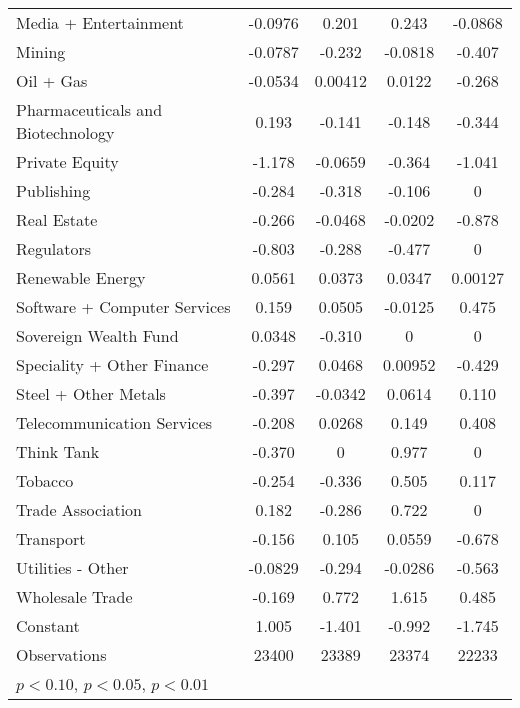 {\begin{longtable}{l*{4}{c}}
Media + Entertainment&  -0.0976         &    0.201         &    0.243\sym{*}  &  -0.0868         \\
Mining          &  -0.0787         &   -0.232         &  -0.0818         &   -0.407\sym{*}  \\
Oil + Gas       &  -0.0534         &  0.00412         &   0.0122         &   -0.268         \\
Pharmaceuticals and Biotechnology&    0.193         &   -0.141         &   -0.148         &   -0.344         \\
Private Equity  &   -1.178\sym{***}&  -0.0659         &   -0.364\sym{**} &   -1.041\sym{***}\\
Publishing      &   -0.284         &   -0.318         &   -0.106         &        0         \\
Real Estate     &   -0.266\sym{*}  &  -0.0468         &  -0.0202         &   -0.878\sym{***}\\
Regulators      &   -0.803\sym{***}&   -0.288         &   -0.477         &        0         \\
Renewable Energy&   0.0561         &   0.0373         &   0.0347         &  0.00127         \\
Software + Computer Services&    0.159         &   0.0505         &  -0.0125         &    0.475\sym{**} \\
Sovereign Wealth Fund&   0.0348         &   -0.310         &        0         &        0         \\
Speciality + Other Finance&   -0.297\sym{**} &   0.0468         &  0.00952         &   -0.429\sym{*}  \\
Steel + Other Metals&   -0.397\sym{**} &  -0.0342         &   0.0614         &    0.110         \\
Telecommunication Services&   -0.208         &   0.0268         &    0.149         &    0.408\sym{*}  \\
Think Tank      &   -0.370         &        0         &    0.977         &        0         \\
Tobacco         &   -0.254         &   -0.336         &    0.505\sym{*}  &    0.117         \\
Trade Association&    0.182         &   -0.286         &    0.722\sym{***}&        0         \\
Transport       &   -0.156         &    0.105         &   0.0559         &   -0.678\sym{**} \\
Utilities - Other&  -0.0829         &   -0.294         &  -0.0286         &   -0.563         \\
Wholesale Trade &   -0.169         &    0.772\sym{*}  &    1.615\sym{***}&    0.485         \\
Constant        &    1.005\sym{***}&   -1.401\sym{***}&   -0.992\sym{***}&   -1.745\sym{***}\\
\midrule
Observations    &    23400         &    23389         &    23374         &    22233         \\
\bottomrule
\multicolumn{5}{l}{\footnotesize \sym{*} \(p<0.10\), \sym{**} \(p<0.05\), \sym{***} \(p<0.01\)}\\
\end{longtable}
}
